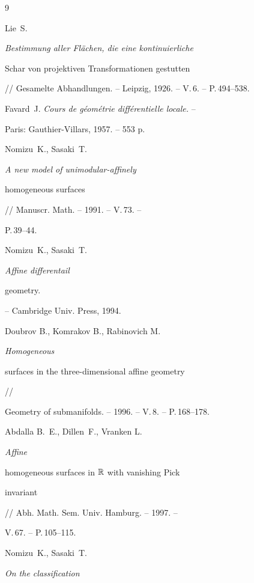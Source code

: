 \begin{thebibliography}{9}







Lie~S. {\em Bestimmung aller Fl\"achen, die eine kontinuierliche


Schar von projektiven Transformationen gestutten}


// Gesamelte Abhandlungen. -- Leipzig, 1926. -- V.\,6. -- P.\,494--538.







Favard~J. {\em Cours de g\'eom\'etrie diff\'erentielle locale.} --


Paris: Gauthier-Villars, 1957. -- 553 p.


 




Nomizu~K., Sasaki~T. {\em A new model of unimodular-affinely


homogeneous surfaces} // Manuscr. Math. -- 1991. -- V.\,73. -- 


P.\,39--44.





 Nomizu~K., Sasaki~T. {\em Affine differentail


geometry.} -- Cambridge Univ. Press, 1994.







Doubrov B., Komrakov B., Rabinovich M. {\em Homogeneous


surfaces in the three-dimensional affine geometry} //


Geometry of submanifolds. -- 1996. -- V.\,8. -- P.\,168--178.





 Abdalla B.~E., Dillen~F., Vranken L. {\em Affine


homogeneous surfaces in $\Bbb R$ with vanishing Pick


invariant} // Abh. Math. Sem. Univ. Hamburg. -- 1997. --


V.\,67. -- P.\,105--115.


 


 Nomizu~K., Sasaki~T. {\em On the classification


}
\end{thebibliography}
